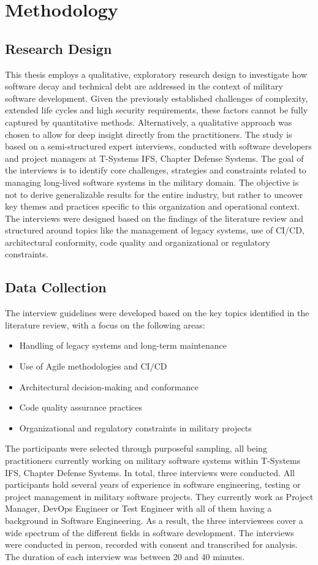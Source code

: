 \section{Methodology}
\subsection{Research Design}
This thesis employs a qualitative, exploratory research design to investigate how software decay and technical debt are addressed in the context of military software development. Given the previously established challenges of complexity, extended life cycles and high security requirements, these factors
cannot be fully captured by quantitative methods.
Alternatively, a qualitative approach was chosen to allow for deep insight directly from the practitioners. The study is based on a semi-structured expert interviews, conducted with software developers and project managers at T-Systems IFS, Chapter Defense Systems. 
The goal of the interviews is to identify core challenges, strategies and constraints related to managing long-lived software systems in the military domain.
The objective is not to derive generalizable results for the entire industry, but rather to uncover key themes and practices specific to this organization and operational context. The interviews were designed based on the findings of the literature review and structured around topics like
the management of legacy systems, use of \ac{CI/CD}, architectural conformity, code quality and organizational or regulatory constraints.

\subsection{Data Collection}
The interview guidelines were developed based on the key topics identified in the literature review, with a focus on the following areas:
\begin{itemize}
    \item Handling of legacy systems and long-term maintenance
    \item Use of Agile methodologies and \ac{CI/CD}
    \item Architectural decision-making and conformance
    \item Code quality assurance practices
    \item Organizational and regulatory constraints in military projects
\end{itemize}
The participants were selected through purposeful sampling, all being practitioners currently working on military software systems within T-Systems IFS, Chapter Defense Systems. In total, three interviews were conducted. All participants hold several years of experience in software engineering, testing or project management
in military software projects. They currently work as Project Manager, DevOps Engineer or Test Engineer with all of them having a background in Software Engineering. As a result, the three interviewees cover a wide spectrum of the different fields in software development.
The interviews were conducted in person, recorded with consent and transcribed for analysis. The duration of each interview was between 20 and 40 minutes.

